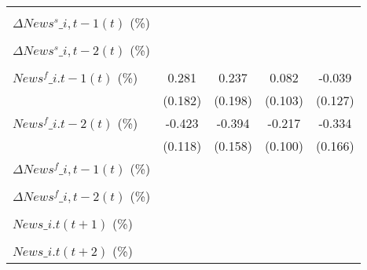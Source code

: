 {\begin{tabular}{l*{4}{c}}
                    &                     &                     &                     &                     \\
\addlinespace
$ \Delta News^s\_{i,t-1}(t)$ (\%)&                     &                     &                     &                     \\
                    &                     &                     &                     &                     \\
\addlinespace
$ \Delta News^s\_{i,t-2}(t)$ (\%)&                     &                     &                     &                     \\
                    &                     &                     &                     &                     \\
\addlinespace
$ News^f\_{i.t-1}(t)$ (\%)&       0.281         &       0.237         &       0.082         &      -0.039         \\
                    &     (0.182)         &     (0.198)         &     (0.103)         &     (0.127)         \\
\addlinespace
$ News^f\_{i.t-2}(t)$ (\%)&      -0.423\sym{***}&      -0.394\sym{**} &      -0.217\sym{**} &      -0.334\sym{*}  \\
                    &     (0.118)         &     (0.158)         &     (0.100)         &     (0.166)         \\
\addlinespace
$ \Delta News^f\_{i,t-1}(t)$ (\%)&                     &                     &                     &                     \\
                    &                     &                     &                     &                     \\
\addlinespace
$ \Delta News^f\_{i,t-2}(t)$ (\%)&                     &                     &                     &                     \\
                    &                     &                     &                     &                     \\
\addlinespace
$ News\_{i.t}(t+1)$ (\%)&                     &                     &                     &                     \\
                    &                     &                     &                     &                     \\
\addlinespace
$ News\_{i.t}(t+2)$ (\%)&                     &                     &                     &                     \\

\end{tabular}}

